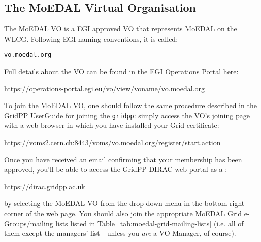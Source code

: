 \subsection{The MoEDAL Virtual Organisation}
\label{sec:vo}
The MoEDAL \acf{VO}
is a \ac{EGI} approved \ac{VO}
that represents \ac{MoEDAL} on the \acf{WLCG}.
Following \ac{EGI} naming conventions, it is called:

\texttt{vo.moedal.org} 

Full details about the \ac{VO} can be found in the \ac{EGI} Operations Portal here:

\href{https://operations-portal.egi.eu/vo/view/voname/vo.moedal.org}{https://operations-portal.egi.eu/vo/view/voname/vo.moedal.org}

To join the \ac{MoEDAL} \ac{VO}, one should follow the same procedure described in the
GridPP UserGuide for joining the \texttt{gridpp}:
simply access the \ac{VO}'s joining page with a web browser in which you have
installed your Grid certificate:

\href{https://voms2.cern.ch:8443/voms/vo.moedal.org/register/start.action}{https://voms2.cern.ch:8443/voms/vo.moedal.org/register/start.action}

Once you have received an email confirming that your membership has been
approved, you'll be able to access the GridPP \acs{DIRAC} web portal
as a :

\href{https://dirac.gridpp.ac.uk}{https://dirac.gridpp.ac.uk}

by selecting the \ac{MoEDAL} \ac{VO} from the drop-down menu in the bottom-right
corner of the web page. You should also join the
appropriate \ac{MoEDAL} Grid e-Groups/mailing lists listed in
Table~\ref{tab:moedal-grid-mailing-lists}
(i.e. all of them except the managers' list - unless you \emph{are}
a VO Manager, of course).

